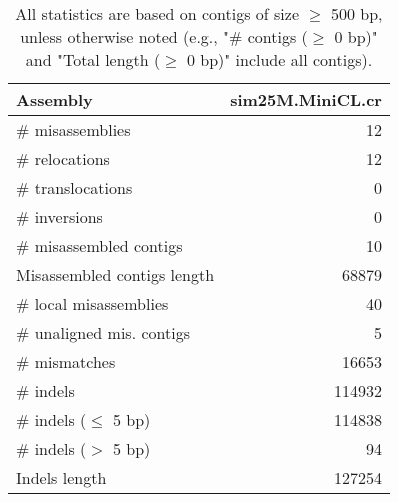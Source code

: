 \documentclass[12pt,a4paper]{article}
\begin{document}
\begin{table}[ht]
\begin{center}
\caption{All statistics are based on contigs of size $\geq$ 500 bp, unless otherwise noted (e.g., "\# contigs ($\geq$ 0 bp)" and "Total length ($\geq$ 0 bp)" include all contigs).}
\begin{tabular}{|l*{1}{|r}|}
\hline
Assembly & sim25M.MiniCL.cr \\ \hline
\# misassemblies & 12 \\ \hline
\hspace{5mm}\# relocations & 12 \\ \hline
\hspace{5mm}\# translocations & 0 \\ \hline
\hspace{5mm}\# inversions & 0 \\ \hline
\# misassembled contigs & 10 \\ \hline
Misassembled contigs length & 68879 \\ \hline
\# local misassemblies & 40 \\ \hline
\# unaligned mis. contigs & 5 \\ \hline
\# mismatches & 16653 \\ \hline
\# indels & 114932 \\ \hline
\hspace{5mm}\# indels ($\leq$ 5 bp) & 114838 \\ \hline
\hspace{5mm}\# indels ($>$ 5 bp) & 94 \\ \hline
Indels length & 127254 \\ \hline
\end{tabular}
\end{center}
\end{table}
\end{document}
